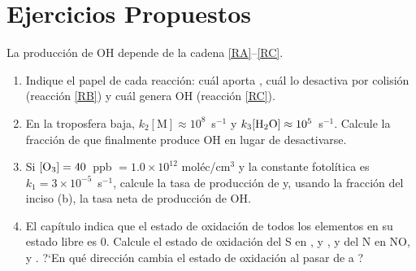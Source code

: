 
\section*{Ejercicios Propuestos}
\label{sec:ejercicios_cap08}

\begin{bloque_ejercicios}

\begin{ejercicios}

\item La producci\'on de OH depende de la cadena
\ref{RA}--\ref{RC}.

\begin{enumerate}[label=\alph*)]
    \item Indique el papel de cada reacci\'on: cu\'al aporta
          , cu\'al lo desactiva por colisi\'on
          (reacci\'on \ref{RB}) y cu\'al genera OH
          (reacci\'on \ref{RC}).

    \item En la troposfera baja, $k_2[\mathrm{M}]
          \approx 10^8$~s$^{-1}$ y
          $k_3[\ce{H2O}] \approx 10^5$~s$^{-1}$.
          Calcule la fracci\'on de  que finalmente
          produce OH en lugar de desactivarse.

    \item Si $[\ce{O3}] = 40$~ppb $= 1.0\times10^{12}$
          mol\'ec/cm$^3$ y la constante fotol\'itica es
          $k_1 = 3\times10^{-5}$~s$^{-1}$, calcule la tasa
          de producci\'on de  y,
          usando la fracci\'on del inciso (b),
          la tasa neta de producci\'on de OH.

    \item El cap\'itulo indica que el estado de oxidaci\'on
          de todos los elementos en su estado libre es 0.
          Calcule el estado de oxidaci\'on del S en
          ,  y , y del N en
          NO,  y .
          ?`En qu\'e direcci\'on cambia el estado de
          oxidaci\'on al pasar de  a ?
\end{enumerate}


\end{ejercicios}
\end{bloque_ejercicios}
